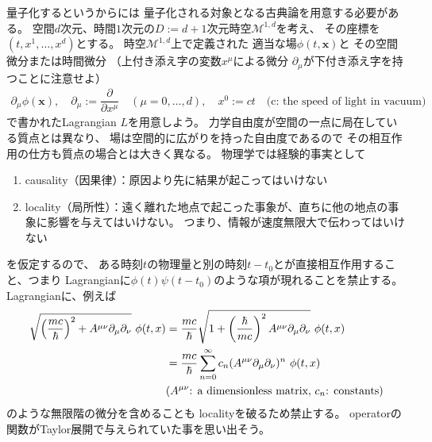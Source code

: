 量子化するというからには
量子化される対象となる古典論を用意する必要がある。
空間$d$次元、時間$1$次元の$D:= d+1$次元時空$\mathcal{M}^{1,d}$を考え、
その座標を$(t, x^1,\dots, x^d)$とする。
時空$\mathcal{M}^{1,d}$上で定義された
適当な場$\phi(t, \bm{x})$と
その空間微分または時間微分
（上付き添え字の変数$x^\mu$による微分
$\partial_\mu$が下付き添え字を持つことに注意せよ）
\begin{align}
    \partial_\mu \phi(\bm{x})
    ,\quad
    \partial_\mu := \dfrac{\partial}{\partial x^\mu}
    \quad
    (\mu = 0,\dots,d)
    ,\quad
    x^0 := c t
    \quad
    \text{(c: the speed of light in vacuum)}
\end{align}
で書かれたLagrangian $L$を用意しよう。
力学自由度が空間の一点に局在している質点とは異なり、
場は空間的に広がりを持った自由度であるので
その相互作用の仕方も質点の場合とは大きく異なる。
物理学では経験的事実として
\begin{enumerate}
    \item{causality（因果律）：原因より先に結果が起こってはいけない}
    \item{locality（局所性）：遠く離れた地点で起こった事象が、直ちに他の地点の事象に影響を与えてはいけない。
    つまり、情報が速度無限大で伝わってはいけない}
\end{enumerate}
を仮定するので、
ある時刻$t$の物理量と別の時刻$t-t_0$とが直接相互作用すること、つまり
Lagrangianに$\phi(t) \psi(t-t_0)$のような項が現れることを禁止する。
Lagrangianに、例えば
\begin{align}
    \sqrt{\left(\dfrac{
        m c
    }{
        \hbar
    }\right)^2 + A^{\mu \nu}\partial_\mu \partial_\nu}
    \ \phi(t,x)
&=
    \dfrac{ m c }{ \hbar }
    \sqrt{
        1 + \left(\dfrac{ \hbar }{ m c }\right)^2
        A^{\mu \nu}\partial_\mu \partial_\nu
    }
    \ \phi(t,x)
\notag\\&= \dfrac{ m c }{ \hbar }
    \sum_{n=0}^\infty
    c_n
    (A^{\mu \nu}\partial_\mu \partial_\nu)^n
    \ \phi(t,x)
\notag\\&
\text{($A^{\mu\nu}$: a dimensionless matrix,  $c_n$: constants)}
\end{align}
のような無限階の微分を含めることも
localityを破るため禁止する。
operatorの関数がTaylor展開で与えられていた事を思い出そう。


